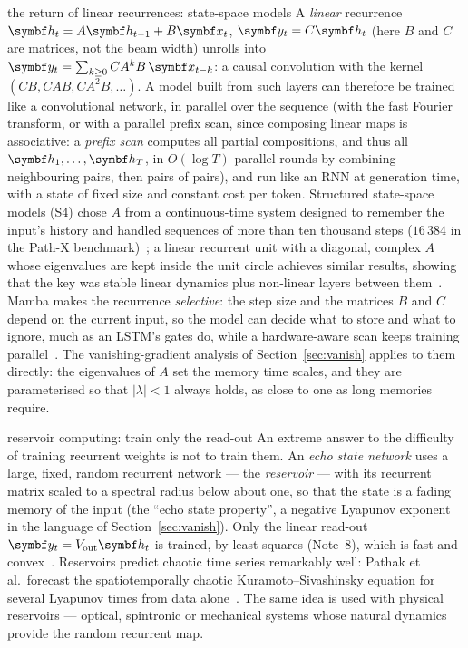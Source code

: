 \documentclass[11pt]{article}
\newcommand{\hv}{\vect{h}}
\newcommand{\yv}{\vect{y}}
\begin{document}
\begin{modern}{the return of linear recurrences: state-space models}
A \emph{linear} recurrence $\hv_t = A\hv_{t-1} + B\x_t$, $\yv_t = C\hv_t$ (here $B$ and $C$ are matrices, not the beam
width) unrolls into $\yv_t = \sum_{k \ge 0} CA^kB\,\x_{t-k}$:
a causal convolution with the kernel $(CB, CAB, CA^2B, \dots)$. A model built from such layers can therefore be trained like a
convolutional network, in parallel over the sequence (with the fast Fourier transform, or with a parallel prefix scan,
since composing linear maps is associative: a \emph{prefix scan} computes all partial compositions, and thus all
$\hv_1, \dots, \hv_T$, in $O(\log T)$ parallel rounds by combining neighbouring pairs, then pairs of pairs), and run like
an RNN at generation time, with a state of fixed size and constant cost per token. Structured state-space models (S4) chose
$A$ from a continuous-time system designed to remember the input's history and handled sequences of more than ten thousand
steps ($16\,384$ in the Path-X benchmark)~\cite{gu2022}; a linear recurrent unit with a diagonal,
complex $A$ whose eigenvalues are kept inside the unit circle achieves similar results, showing that the key was
stable linear dynamics plus non-linear layers between them~\cite{orvieto2023}. Mamba makes the recurrence
\emph{selective}: the step size and the matrices $B$ and $C$ depend on the current input, so the model can decide what to
store and what to ignore, much as an LSTM's gates do, while a hardware-aware scan keeps training parallel~\cite{gu2023}.
The vanishing-gradient analysis of Section~\ref{sec:vanish} applies to them directly: the eigenvalues of $A$ set the
memory time scales, and they are parameterised so that $|\lambda| < 1$ always holds, as close to one as long memories
require.
\end{modern}

\begin{physics}{reservoir computing: train only the read-out}
An extreme answer to the difficulty of training recurrent weights is not to train them. An \emph{echo state network}
uses a large, fixed, random recurrent network --- the \emph{reservoir} --- with its recurrent matrix scaled to a spectral
radius below about one, so that the state is a fading memory of the input (the ``echo state property'', a negative
Lyapunov exponent in the language of Section~\ref{sec:vanish}). Only the linear read-out $\yv_t = V_{\mathrm{out}}\hv_t$ is
trained, by least squares (Note~8), which is fast and convex~\cite{jaeger2004}. Reservoirs predict chaotic time series
remarkably well: Pathak et al.\ forecast the spatiotemporally chaotic Kuramoto--Sivashinsky equation for several Lyapunov
times from data alone~\cite{pathak2018}. The same idea is used with physical reservoirs --- optical, spintronic or mechanical
systems whose natural dynamics provide the random recurrent map.
\end{physics}
\end{document}
